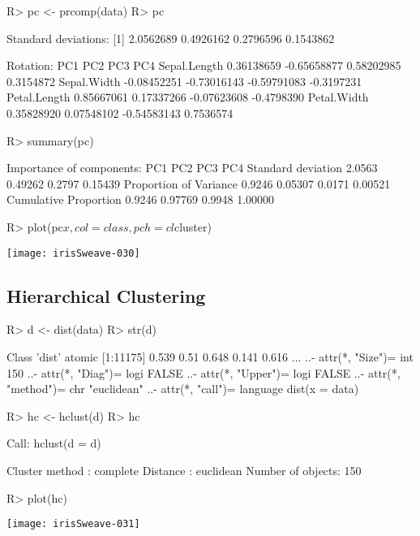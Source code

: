 \documentclass[fleqn, letter, 10pt]{article}
\begin{document}
\begin{Schunk}
\begin{Sinput}
R> pc <- prcomp(data)
R> pc
\end{Sinput}
\begin{Soutput}
Standard deviations:
[1] 2.0562689 0.4926162 0.2796596 0.1543862

Rotation:
                     PC1         PC2         PC3        PC4
Sepal.Length  0.36138659 -0.65658877  0.58202985  0.3154872
Sepal.Width  -0.08452251 -0.73016143 -0.59791083 -0.3197231
Petal.Length  0.85667061  0.17337266 -0.07623608 -0.4798390
Petal.Width   0.35828920  0.07548102 -0.54583143  0.7536574
\end{Soutput}
\begin{Sinput}
R> summary(pc)
\end{Sinput}
\begin{Soutput}
Importance of components:
                          PC1     PC2    PC3     PC4
Standard deviation     2.0563 0.49262 0.2797 0.15439
Proportion of Variance 0.9246 0.05307 0.0171 0.00521
Cumulative Proportion  0.9246 0.97769 0.9948 1.00000
\end{Soutput}
\begin{Sinput}
R> plot(pc$x, col=class, pch=cl$cluster)
\end{Sinput}
\end{Schunk}
\texttt{[image: irisSweave-030]}

\subsection{Hierarchical Clustering}

\begin{Schunk}
\begin{Sinput}
R> d <- dist(data)
R> str(d)
\end{Sinput}
\begin{Soutput}
Class 'dist'  atomic [1:11175] 0.539 0.51 0.648 0.141 0.616 ...
  ..- attr(*, "Size")= int 150
  ..- attr(*, "Diag")= logi FALSE
  ..- attr(*, "Upper")= logi FALSE
  ..- attr(*, "method")= chr "euclidean"
  ..- attr(*, "call")= language dist(x = data)
\end{Soutput}
\begin{Sinput}
R> hc <- hclust(d)
R> hc
\end{Sinput}
\begin{Soutput}
Call:
hclust(d = d)

Cluster method   : complete 
Distance         : euclidean 
Number of objects: 150 
\end{Soutput}
\begin{Sinput}
R> plot(hc)
\end{Sinput}
\end{Schunk}
\texttt{[image: irisSweave-031]}
\end{document}
